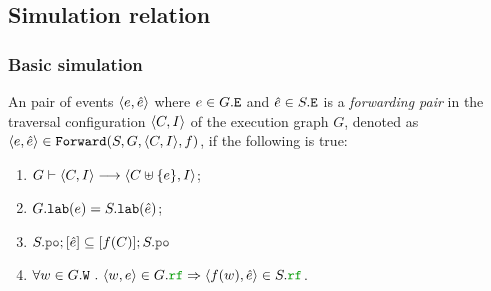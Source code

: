 \documentclass[12pt]{article}
\begin{document}
\subsection{Simulation relation}

\subsubsection{Basic simulation}

\begin{definition}
  An pair of events $\langle e, \hat{e} \rangle$ where $e \in G.{\mathtt{E}}$ and $\hat{e} \in S.{\mathtt{E}}$
  is a \emph{forwarding pair} in
  the traversal configuration $\langle C, I \rangle$ of the \imm execution graph $G$,
  denoted as $\langle e, \hat{e} \rangle \in {\mathtt{Forward}}(S, G, \langle C, I \rangle, f)$, if the following is true:
  \begin{enumerate}[label=\textbf{F.\arabic*}]

    \item \label{item:frwd-coverable}
      $G \vdash \langle C, I \rangle \longrightarrow \langle C \uplus \{e\}, I \rangle$;
     
    \item \label{item:frwd-lab}
      $G.{\mathtt{lab}}(e) = S.{\mathtt{lab}}(\hat{e})$;

    \item \label{item:frwd-front}
      $S.\lPO;[\hat{e}] \subseteq [f(C)];S.\lPO$

    \item \label{item:frwd-rf}
      $\forall{w \in G.\lW} ~.~ \tup{w, e} \in G.\lRF \Rightarrow \tup{f(w), \hat{e}} \in S.\lRF$.

  \end{enumerate}
\end{definition}
\end{document}
